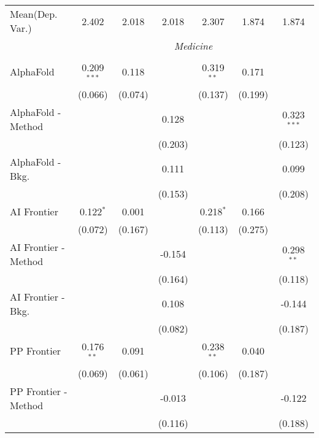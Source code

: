 \begin{tabular}{lcccccc}
Mean(Dep. Var.) & 2.402 & 2.018 & 2.018 & 2.307 & 1.874 & 1.874 \\
 & \multicolumn{6}{c}{\textit{Medicine}} \\ \\
   AlphaFold            & 0.209$^{***}$ & 0.118         &              & 0.319$^{**}$ & 0.171   &   \\   
                        & (0.066)       & (0.074)       &              & (0.137)      & (0.199) &   \\   
   AlphaFold - Method   &               &               & 0.128        &              &         & 0.323$^{***}$\\   
                        &               &               & (0.203)      &              &         & (0.123)\\   
   AlphaFold - Bkg.     &               &               & 0.111        &              &         & 0.099\\   
                        &               &               & (0.153)      &              &         & (0.208)\\   
   AI Frontier          & 0.122$^{*}$   & 0.001         &              & 0.218$^{*}$  & 0.166   &   \\   
                        & (0.072)       & (0.167)       &              & (0.113)      & (0.275) &   \\   
   AI Frontier - Method &               &               & -0.154       &              &         & 0.298$^{**}$\\   
                        &               &               & (0.164)      &              &         & (0.118)\\   
   AI Frontier - Bkg.   &               &               & 0.108        &              &         & -0.144\\   
                        &               &               & (0.082)      &              &         & (0.187)\\   
   PP Frontier          & 0.176$^{**}$  & 0.091         &              & 0.238$^{**}$ & 0.040   &   \\   
                        & (0.069)       & (0.061)       &              & (0.106)      & (0.187) &   \\   
   PP Frontier - Method &               &               & -0.013       &              &         & -0.122\\   
                        &               &               & (0.116)      &              &         & (0.188)\\   

\end{tabular}
